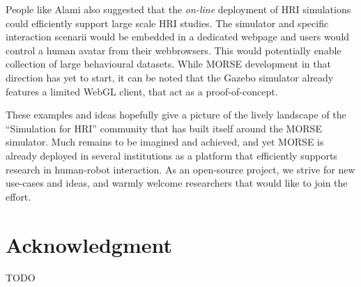 \documentclass[conference]{IEEEtran}
\begin{document}
People like Alami also suggested that the \emph{on-line} deployment of HRI
simulations could efficiently support large scale HRI studies. The simulator and
specific interaction scenarii would be embedded in a dedicated webpage and users
would control a human avatar from their webbrowsers. This would potentially
enable collection of large behavioural datasets. While MORSE development in
that direction has yet to start, it can be noted that the Gazebo simulator
already features a limited WebGL client, that act as a proof-of-concept.

These examples and ideas hopefully give a picture of the lively landscape of the
``Simulation for HRI'' community that has built itself around the MORSE
simulator. Much remains to be imagined and achieved, and yet MORSE is already
deployed in several institutions as a platform that efficiently supports
research in human-robot interaction. As an open-source project, we strive for
new use-cases and ideas, and warmly welcome researchers that would like to join
the effort.

\section*{Acknowledgment}
TODO



\end{document}
